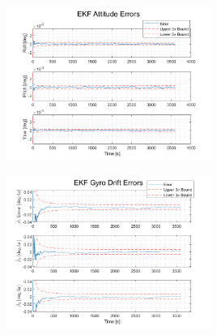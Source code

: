 \documentclass[12pt]{report}
\begin{document}
\begin{figure}[h!]
	\centering
	\begin{minipage}{.5\textwidth}
		\centering
		\includegraphics[height=5cm, keepaspectratio]{ekfAttErr.png}
		\label{fig:ex1}
	\end{minipage}%
	\begin{minipage}{.5\textwidth}
		\centering
		\includegraphics[height=5cm, keepaspectratio]{ekfBiasErr.png}
		\label{fig:ex2}
	\end{minipage}
\end{figure}
\end{document}
